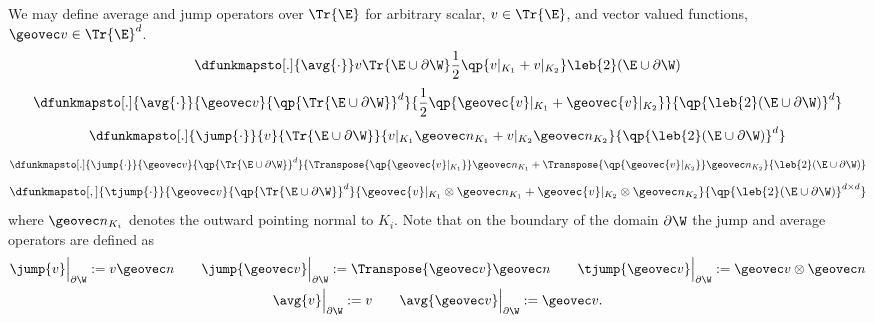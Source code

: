 \documentclass[final]{amsart}
\numberwithin{equation}{section}
\begin{document}
\begin{Defn}
  \label{defn:averages-and-jumps}
  We may define average and jump operators over $\Tr{\E}$ for
  arbitrary scalar, $v\in\Tr{\E}$, and vector valued functions, $\geovec
  v\in\Tr{\E}^d$.
  \begin{equation}
    \label{eqn:average}
    \dfunkmapsto[.]
	        {\avg{\cdot}}
	        v
	        {\Tr{\E\cup \partial\W}}
	        {\frac{1}{2}\qp{v|_{K_1} + v|_{K_2}}}
	        {\leb{2}(\E\cup \partial\W)}
  \end{equation}
  \begin{equation}
    \label{eqn:average-vec}
    \dfunkmapsto[.]
	        {\avg{\cdot}}
	        {\geovec v}
	        {\qp{\Tr{\E\cup \partial\W}}^d}
	        {\frac{1}{2}\qp{\geovec{v}|_{K_1} + \geovec{v}|_{K_2}}}
	        {\qp{\leb{2}(\E\cup \partial\W)}^d}
  \end{equation}
  \begin{equation}
    \label{eqn:jump}
    \dfunkmapsto[.]
	        {\jump{\cdot}}
	        {v}
	        {\Tr{\E\cup \partial\W}}
	        {{{v}|_{K_1} \geovec n_{K_1} + {v}|_{K_2}} \geovec n_{K_2}}
	        {\qp{\leb{2}(\E\cup \partial\W)}^d}
  \end{equation}
  \begin{equation}
    \label{eqn:jump-vec}
    \dfunkmapsto[.]
	        {\jump{\cdot}}
	        {\geovec v}
	        {\qp{\Tr{\E\cup \partial\W}}^d}
	        {{\Transpose{\qp{\geovec{v}|_{K_1}}}\geovec n_{K_1} + \Transpose{\qp{\geovec{v}|_{K_2}}}\geovec n_{K_2}}}
	        {\leb{2}(\E\cup \partial\W)}
  \end{equation}
  \begin{equation}
    \label{eqn:tensor-jump}
    \dfunkmapsto[,]
	        {\tjump{\cdot}}
	        {\geovec v}
	        {\qp{\Tr{\E\cup \partial\W}}^d}
	        {{\geovec{v}|_{K_1} }\otimes \geovec n_{K_1} + \geovec{v}|_{K_2} \otimes\geovec n_{K_2}}
	        {\qp{\leb{2}(\E\cup \partial\W)}^{d\times d}}
  \end{equation}
  where $\geovec n_{K_i}$ denotes the outward pointing normal to $K_i$.
  Note that on the boundary of the domain $\partial\W$ the jump and
  average operators are defined as
  \begin{gather}
    \jump{v}
    \Big\vert_{\partial\W}
    := 
    v\geovec n
    \qquad 
    \jump{\geovec v}
    \Big\vert_{\partial\W} 
    :=
    \Transpose{\geovec v}\geovec n 
    \qquad
    \tjump{\geovec v}
    \Big\vert_{\partial\W} 
    :=
    \geovec v\otimes\geovec n 
    \\
    \avg{v}
    \Big\vert_{\partial\W} 
    := v
    \qquad 
    \avg{\geovec v}
    \Big\vert_{\partial\W}
    :=
    \geovec v.
  \end{gather}
\end{Defn}
\end{document}
